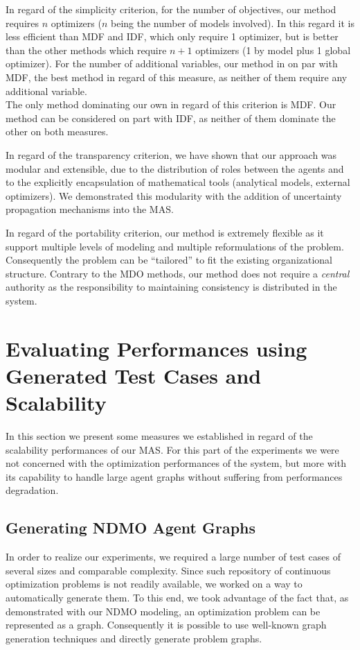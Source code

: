 In regard of the simplicity criterion, for the number of objectives, our method requires $n$ optimizers ($n$ being the number of models involved). In this regard it is less efficient than MDF and IDF, which only require 1 optimizer, but is better than the other methods which require $n+1$ optimizers (1 by model plus 1 global optimizer). For the number of additional variables, our method in on par with MDF, the best method in regard of this measure, as neither of them require any additional variable.\\
The only method dominating our own in regard of this criterion is MDF. Our method can be considered on part with IDF, as neither of them dominate the other on both measures.

In regard of the transparency criterion, we have shown that our approach was modular and extensible, due to the distribution of roles between the agents and to the explicitly encapsulation of mathematical tools (analytical models, external optimizers). We demonstrated this modularity with the addition of uncertainty propagation mechanisms into the MAS.

In regard of the portability criterion, our method is extremely flexible as it support multiple levels of modeling and multiple reformulations of the problem. Consequently the problem can be \enquote{tailored} to fit the existing organizational structure. Contrary to the MDO methods, our method does not require a \emph{central} authority as the responsibility to maintaining consistency is distributed in the system.

\chapter{Evaluating Performances using Generated Test Cases and Scalability}

In this section we present some measures we established in regard of the scalability performances of our MAS. For this part of the experiments we were not concerned with the optimization performances of the system, but more with its capability to handle large agent graphs without suffering from performances degradation.

\section{Generating NDMO Agent Graphs}

In order to realize our experiments, we required a large number of test cases of several sizes and comparable complexity. Since such repository of continuous optimization problems is not readily available, we worked on a way to automatically generate them. To this end, we took advantage of the fact that, as demonstrated with our NDMO modeling, an optimization problem can be represented as a graph. Consequently it is possible to use well-known graph generation techniques and directly generate problem graphs.

